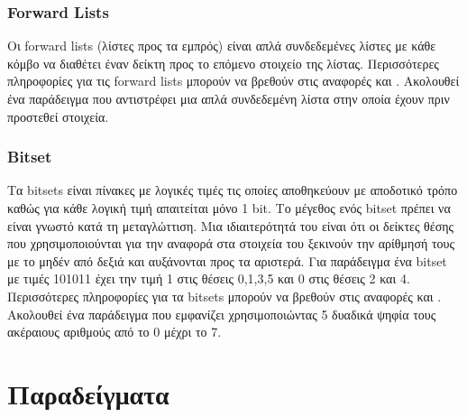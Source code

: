 


\subsubsection{Forward Lists}
Οι forward lists (λίστες προς τα εμπρός) είναι απλά συνδεδεμένες λίστες με κάθε κόμβο να διαθέτει έναν δείκτη προς το επόμενο στοιχείο της λίστας. Περισσότερες πληροφορίες για τις forward lists μπορούν να βρεθούν στις αναφορές \cite{g4gforwardlist1} και \cite{g4gforwardlist2}. Ακολουθεί ένα παράδειγμα που αντιστρέφει μια απλά συνδεδεμένη λίστα στην οποία έχουν πριν προστεθεί στοιχεία.






\subsubsection{Bitset}
Τα bitsets είναι πίνακες με λογικές τιμές τις οποίες αποθηκεύουν με αποδοτικό τρόπο καθώς για κάθε λογική τιμή απαιτείται μόνο 1 bit. Το μέγεθος ενός bitset πρέπει να είναι γνωστό κατά τη μεταγλώττιση. Μια ιδιαιτερότητά του είναι ότι οι δείκτες θέσης που χρησιμοποιούνται για την αναφορά στα στοιχεία του ξεκινούν την αρίθμησή τους με το μηδέν από δεξιά και αυξάνονται προς τα αριστερά. Για παράδειγμα ένα bitset με τιμές 101011 έχει την τιμή 1 στις θέσεις 0,1,3,5 και 0 στις θέσεις 2 και 4. Περισσότερες πληροφορίες για τα bitsets μπορούν να βρεθούν στις αναφορές \cite{g4gbitset1} και \cite{g4gbitset2}. Ακολουθεί ένα παράδειγμα που εμφανίζει χρησιμοποιώντας 5 δυαδικά ψηφία τους ακέραιους αριθμούς από το 0 μέχρι το 7.





\section{Παραδείγματα}
